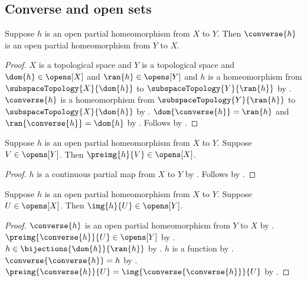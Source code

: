 \subsection{Converse and open sets}

\begin{theorem}\label{open_partial_homeomorphism_converse}
    Suppose $h$ is an open partial homeomorphism from $X$ to $Y$.
    Then $\converse{h}$ is an open partial homeomorphism from $Y$ to $X$.
\end{theorem}
\begin{proof}
    $X$ is a topological space and $Y$ is a topological space and
        $\dom{h}\in\opens[X]$ and $\ran{h}\in\opens[Y]$ and
        $h$ is a homeomorphism from $\subspaceTopology{X}{\dom{h}}$
            to $\subspaceTopology{Y}{\ran{h}}$ by
        .
    $\converse{h}$ is a homeomorphism from $\subspaceTopology{Y}{\ran{h}}$
        to $\subspaceTopology{X}{\dom{h}}$ by .
    $\dom{\converse{h}}=\ran{h}$ and $\ran{\converse{h}}=\dom{h}$ by
        .
    Follows by .
\end{proof}

\begin{theorem}\label{open_partial_homeomorphism_preimage_open}
    Suppose $h$ is an open partial homeomorphism from $X$ to $Y$.
    Suppose $V\in\opens[Y]$.
    Then $\preimg{h}{V}\in\opens[X]$.
\end{theorem}
\begin{proof}
    $h$ is a continuous partial map from $X$ to $Y$ by
        .
    Follows by .
\end{proof}

\begin{theorem}\label{open_partial_homeomorphism_image_open}
    Suppose $h$ is an open partial homeomorphism from $X$ to $Y$.
    Suppose $U\in\opens[X]$.
    Then $\img{h}{U}\in\opens[Y]$.
\end{theorem}
\begin{proof}
    $\converse{h}$ is an open partial homeomorphism from $Y$ to $X$ by
        .
    $\preimg{\converse{h}}{U}\in\opens[Y]$ by
        .
    $h\in\bijections{\dom{h}}{\ran{h}}$ by
        .
    $h$ is a function by .
    $\converse{\converse{h}}=h$ by .
    $\preimg{\converse{h}}{U}=\img{\converse{\converse{h}}}{U}$ by
        .
\end{proof}

